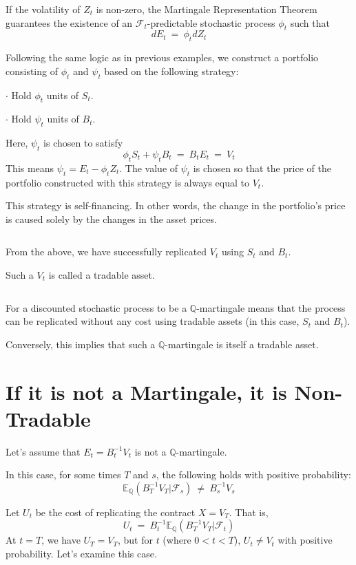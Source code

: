 \documentclass[uplatex,a4j,12pt,dvipdfmx]{jsarticle}
\begin{document}
${}$

If the volatility of $Z_{t}$ is non-zero, the Martingale Representation Theorem guarantees the existence of an $\mathcal{F}_{t}$-predictable stochastic process $\phi_{t}$ such that
$$
	dE_{t}
	\ = \
	\phi_{t} dZ_{t}
$$

Following the same logic as in previous examples, we construct a portfolio consisting of $\phi_{t}$ and $\psi_{t}$ based on the following strategy:

\hspace{5mm} $\cdot$ Hold $\phi_{t}$ units of $S_{t}$.

\hspace{5mm} $\cdot$ Hold $\psi_{t}$ units of $B_{t}$.

Here, $\psi_{t}$ is chosen to satisfy
$$
	\phi_{t} S_{t} + \psi_{t} B_{t} \ = \ B_{t} E_{t} \ = \ V_{t}
$$
This means $\psi_{t} = E_{t} - \phi_{t} Z_{t}$. The value of $\psi_{t}$ is chosen so that the price of the portfolio constructed with this strategy is always equal to $V_{t}$.

This strategy is self-financing. In other words, the change in the portfolio's price is caused solely by the changes in the asset prices.

${}$

From the above, we have successfully replicated $V_{t}$ using $S_{t}$ and $B_{t}$.

Such a $V_{t}$ is called a tradable asset.

${}$

For a discounted stochastic process to be a $\mathbb{Q}$-martingale means that the process can be replicated without any cost using tradable assets (in this case, $S_{t}$ and $B_{t}$).

Conversely, this implies that such a $\mathbb{Q}$-martingale is itself a tradable asset.

\section{If it is not a Martingale, it is Non-Tradable}

Let's assume that $E_{t} = B^{-1}_{t} V_{t}$ is not a $\mathbb{Q}$-martingale.

In this case, for some times $T$ and $s$, the following holds with positive probability:
$$
	\mathbb{E}_{\mathbb{Q}}( B^{-1}_{T} V_{T} | \mathcal{F}_{s} )
	\ \neq \
	B^{-1}_{s} V_{s}
$$

Let $U_{t}$ be the cost of replicating the contract $X=V_{T}$. That is,
$$
	U_{t}
	\ = \
	B^{-1}_{t}
	\mathbb{E}_{\mathbb{Q}}( B^{-1}_{T} V_{T} | \mathcal{F}_{t} )
$$
At $t=T$, we have $U_{T}=V_{T}$, but for $t$ (where $0<t<T$), $U_{t} \neq V_{t}$ with positive probability. Let's examine this case.
\end{document}
